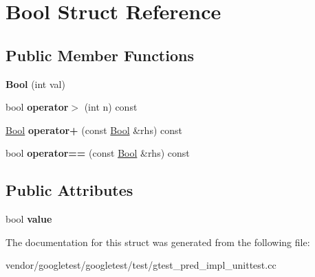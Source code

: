 \hypertarget{struct_bool}{}\section{Bool Struct Reference}
\label{struct_bool}
\subsection*{Public Member Functions}
\begin{DoxyCompactItemize}
\item 
\mbox{\label{struct_bool_a03dfd4851b13abb29414887fcada7fca}} 
{\bfseries Bool} (int val)
\item 
\mbox{\label{struct_bool_a7baecbc58992eb06157fbbbaa560be0b}} 
bool {\bfseries operator$>$} (int n) const
\item 
\mbox{\label{struct_bool_a6f4ecdec19082e896cffce66e6b6e7cc}} 
\hyperlink{struct_bool}{Bool} {\bfseries operator+} (const \hyperlink{struct_bool}{Bool} \&rhs) const
\item 
\mbox{\label{struct_bool_afe799a4977c5ebe4c215d5d4ebd77adb}} 
bool {\bfseries operator==} (const \hyperlink{struct_bool}{Bool} \&rhs) const
\end{DoxyCompactItemize}
\subsection*{Public Attributes}
\begin{DoxyCompactItemize}
\item 
\mbox{\label{struct_bool_a16be863c269f988cdcbe59f9d846a141}} 
bool {\bfseries value}
\end{DoxyCompactItemize}


The documentation for this struct was generated from the following file\+:\begin{DoxyCompactItemize}
\item 
vendor/googletest/googletest/test/gtest\+\_\+pred\+\_\+impl\+\_\+unittest.\+cc\end{DoxyCompactItemize}
